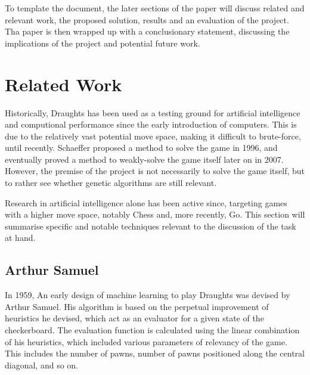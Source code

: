 \documentclass[12pt,a4paper]{article}
\begin{document}
    To template the document, the later sections of the paper will discuss related and relevant work, the proposed solution, results and an evaluation of the project. Tha paper is then wrapped up with a conclusionary statement, discussing the implications of the project and potential future work.

\section{Related Work}

    Historically, Draughts has been used as a testing ground for artificial intelligence and computional performance since the early introduction of computers. This is due to the relatively vast potential move space, making it difficult to brute-force, until recently. Schaeffer proposed a method to solve the game in 1996\cite{schaeffer_solving_1996}, and eventually proved a method to weakly-solve the game itself later on in 2007\cite{schaeffer_checkers_2007}. However, the premise of the project is not necessarily to solve the game itself, but to rather see whether genetic algorithms are still relevant.

    Research in artificial intelligence alone has been active since, targeting games with a higher move space, notably Chess and, more recently, Go. This section will summarise specific and notable techniques relevant to the discussion of the task at hand.

    \subsection{Arthur Samuel}
        In 1959, An early design of machine learning to play Draughts was devised by Arthur Samuel\cite{samuel_studies_1959}. His algorithm is based on the perpetual improvement of heuristics he devised, which act as an evaluator for a given state of the checkerboard. The evaluation function is calculated using the linear combination of his heuristics, which included various parameters of relevancy of the game. This includes the number of pawns, number of pawns positioned along the central diagonal, and so on. 
\end{document}
